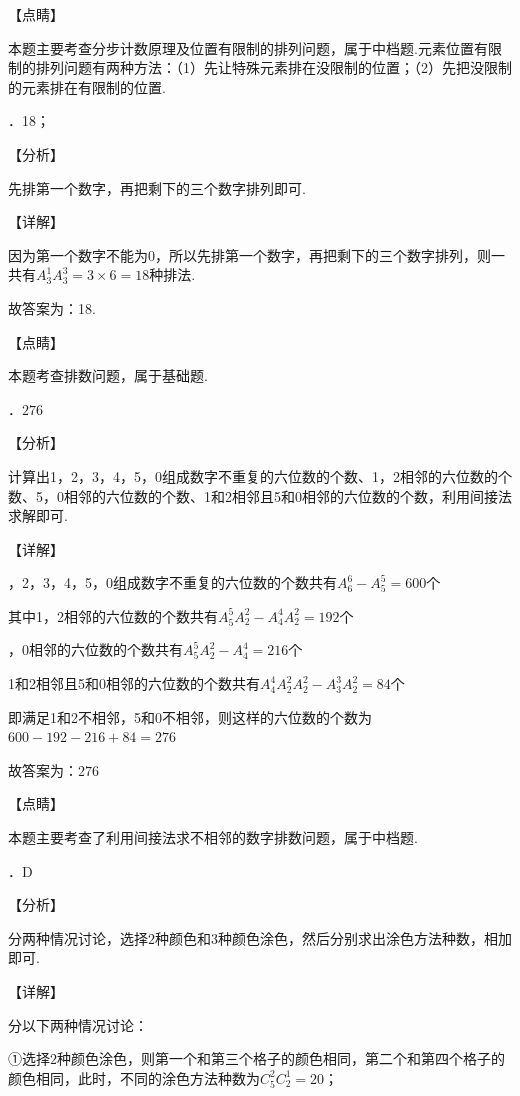 \documentclass[a4paper,11pt,UTF8,twoside]{ctexart} %
\begin{document}
\noindent 【点睛】

\noindent 本题主要考查分步计数原理及位置有限制的排列问题，属于中档题.元素位置有限制的排列问题有两种方法：（1）先让特殊元素排在没限制的位置；（2）先把没限制的元素排在有限制的位置.

．18；

\noindent 【分析】

\noindent 先排第一个数字，再把剩下的三个数字排列即可.

\noindent 【详解】

\noindent 因为第一个数字不能为0，所以先排第一个数字，再把剩下的三个数字排列，则一共有$A_{3}^{1} A_{3}^{3} =3\times 6=18$种排法.

\noindent 故答案为：18.

\noindent 【点睛】

\noindent 本题考查排数问题，属于基础题.

．$276$

\noindent 【分析】

\noindent 计算出1，2，3，4，5，0组成数字不重复的六位数的个数、1，2相邻的六位数的个数、5，0相邻的六位数的个数、1和2相邻且5和0相邻的六位数的个数，利用间接法求解即可.

\noindent 【详解】

，2，3，4，5，0组成数字不重复的六位数的个数共有$A_{6}^{6} -A_{5}^{5} =600$个

\noindent 其中1，2相邻的六位数的个数共有$A_{5}^{5} A_{2}^{2} -A_{4}^{4} A_{2}^{2} =192$个

，0相邻的六位数的个数共有$A_{5}^{5} A_{2}^{2} -A_{4}^{4} =216$个

\noindent 1和2相邻且5和0相邻的六位数的个数共有$A_{4}^{4} A_{2}^{2} A_{2}^{2} -A_{3}^{3} A_{2}^{2} =84$个

\noindent 即满足1和2不相邻，5和0不相邻，则这样的六位数的个数为$600-192-216+84=276$

\noindent 故答案为：$276$

\noindent 【点睛】

\noindent 本题主要考查了利用间接法求不相邻的数字排数问题，属于中档题.

．D

\noindent 【分析】

\noindent 分两种情况讨论，选择$2$种颜色和$3$种颜色涂色，然后分别求出涂色方法种数，相加即可.

\noindent 【详解】

\noindent 分以下两种情况讨论：

\noindent ①选择$2$种颜色涂色，则第一个和第三个格子的颜色相同，第二个和第四个格子的颜色相同，此时，不同的涂色方法种数为$C_{5}^{2} C_{2}^{1} =20$；
\end{document}
